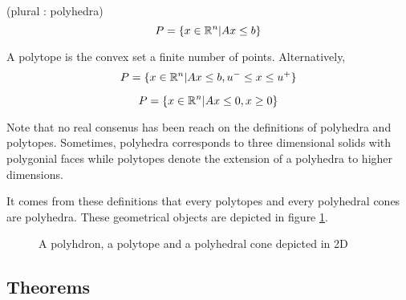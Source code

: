 \begin{definition}[Polyhedron] (plural : polyhedra)
    \[
        P = \{ x\in\mathbb R^n | Ax\le b \}
    \]
\end{definition}

\begin{definition}[Polytope] A polytope is the convex set a finite number of points. Alternatively, 
    \[
        P = \{ x\in\mathbb R^n | Ax\le b, u^- \le x \le u^+ \}
    \]
\end{definition}

\begin{definition}
    \[
        P = \{ x\in\mathbb R^n | Ax \le 0, x\ge 0 \}
    \]
\end{definition}

\begin{observation}[Important]
    Note that no real consenus has been reach on the definitions of polyhedra and polytopes. Sometimes, polyhedra corresponds to three dimensional solids with polygonial faces while polytopes denote the extension of a polyhedra to higher dimensions. 
\end{observation}

It comes from these definitions that every polytopes and every polyhedral cones are polyhedra. These geometrical objects are depicted in figure \ref{fig:polyhedral_geometry}. 

\begin{figure}[h!]
    \centering
    \caption{A polyhdron, a polytope and a polyhedral cone depicted in 2D}
    \label{fig:polyhedral_geometry}
\end{figure}

\subsection{Theorems}

